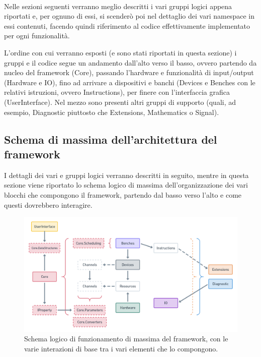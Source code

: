 \documentclass{article}
\begin{document}
		\paragraph*{}
		Nelle sezioni seguenti verranno meglio descritti i vari gruppi logici appena riportati e, per ognuno di essi, si scenderò poi nel dettaglio dei vari namespace in essi contenuti, facendo quindi riferimento al codice effettivamente implementato per ogni funzionalità.
		\par
		L'ordine con cui verranno esposti (e sono stati riportati in questa sezione) i gruppi e il codice segue un andamento dall'alto verso il basso, ovvero partendo da nucleo del framework (Core), passando l'hardware e funzionalità di input/output (Hardware e IO), fino ad arrivare a dispositivi e banchi (Devices e Benches con le relativi istruzioni, ovvero Instructions), per finere con l'interfaccia grafica (UserInterface).
		\newline
		Nel mezzo sono presenti altri gruppi di supporto (quali, ad esempio, Diagnostic piuttosto che Extensions, Mathematics o Signal).
	\newpage
	
	\subsection{Schema di massima dell'architettura del framework}
		I dettagli dei vari e gruppi logici verranno descritti in seguito, mentre in questa sezione viene riportato lo schema logico di massima dell'organizzazione dei vari blocchi che compongono il framework, partendo dal basso verso l'alto e come questi dovrebbero interagire.
		
		\begin{figure}[htbp]
			\includegraphics[width=1\textwidth, center] {img/framework_logic_scheme.png}
			\caption[Schema logico del funzionamento del framework]
			{Schema logico di funzionamento di massima del framework, con le varie interazioni di base tra i vari elementi che lo compongono. \label{fig:frameworkLogicScheme}}
		\end{figure} 
		
\end{document}
